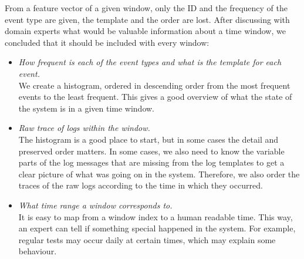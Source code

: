 From a feature vector of a given window, only the ID and the frequency of the event type are given, the template and the order are lost.
After discussing with domain experts what would be valuable information about a time window, we concluded that it should be included with every window:
\begin{itemize}
    \item \textit{How frequent is each of the event types and what is the template for each event.}\\
    We create a histogram, ordered in descending order from the most frequent events to the least frequent. This gives a good overview of what the state of the system is in a given time window. 
    \item \textit{Raw trace of logs within the window.}\\
    The histogram is a good place to start, but in some cases the detail and preserved order matters. In some cases, we also need to know the variable parts of the log messages that are missing from the log templates to get a clear picture of what was going on in the system. Therefore, we also order the traces of the raw logs according to the time in which they occurred.
    \item \textit{What time range a window corresponds to.}\\
    It is easy to map from a window index to a human readable time. This way, an expert can tell if something special happened in the system. For example, regular tests may occur daily at certain times, which may explain some behaviour.
\end{itemize}
 

